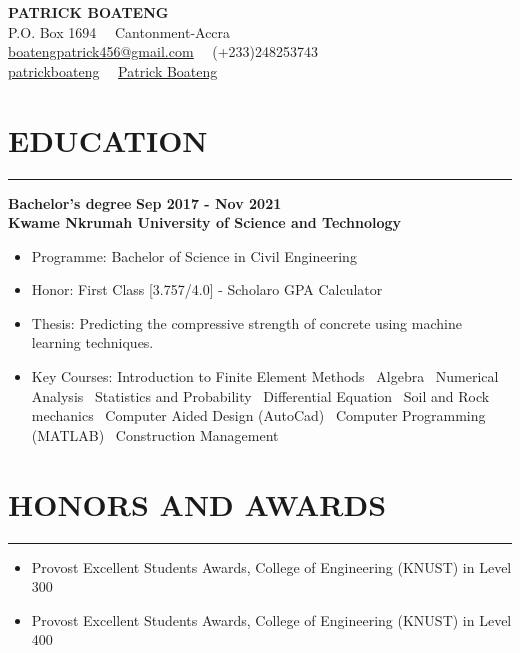 \documentclass[letterpaper, 12pt]{article}
\newcommand{\cvsection}[1]{
	
	\section*{#1}	
	\rule[20pt]{\linewidth}{0.5pt} %

}
\newcommand{\verticalSpace}{4pt}
\newcommand{\itemizeMargin}{11pt}
\begin{document}
	
	
	\begin{center}
		
	{\huge{\textbf{PATRICK BOATENG}}} \\ [\verticalSpace]
	
	P.O. Box 1694 \, \vrule \, Cantonment-Accra \\ [\verticalSpace]
	
	\faEnvelope \space \href{mailto:boatengpatrick456@gmail.com}{\underline{boatengpatrick456@gmail.com}}
	\, \vrule \,
	\faPhone \space (+233)248253743 \\ [\verticalSpace]
	\faGithub \space \href{https://www.github.com/Pato546}{\underline{patrickboateng}}
	\, \vrule \,
	\faLinkedin \space \href{https://www.linkedin.com/in/patrickboateng}{\underline{Patrick Boateng}}
	
	\end{center}
	
	
	\cvsection{EDUCATION} 	
	
	\textbf{Bachelor's degree} \hfill \textbf{Sep 2017 - Nov 2021} \\ [\verticalSpace]
	\textbf{Kwame Nkrumah University of Science and Technology}
	
	\begin{itemize}[leftmargin=\itemizeMargin]
		
		\item Programme: Bachelor of Science in Civil Engineering
		\item Honor: First Class [3.757/4.0] - Scholaro GPA Calculator
		\item Thesis: Predicting the compressive strength of concrete using machine learning techniques.
		\item Key Courses: Introduction to Finite Element Methods \vrule \, Algebra \vrule \, Numerical Analysis \vrule \, Statistics and Probability \vrule \, Differential Equation \vrule \, Soil and Rock mechanics \vrule \, Computer Aided Design (AutoCad) \vrule \, Computer Programming (MATLAB) \vrule \, Construction Management
	
	\end{itemize}
	
	
	\cvsection{HONORS AND AWARDS}
	
	\begin{itemize}[leftmargin=\itemizeMargin]
		
		\item Provost Excellent Students Awards, College of Engineering (KNUST) in Level 300
		\item Provost Excellent Students Awards, College of Engineering (KNUST) in Level 400
		
	\end{itemize}
	
\end{document}
